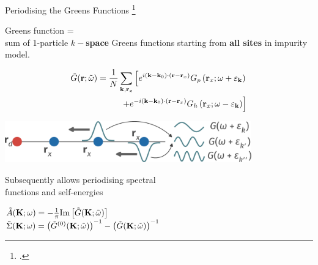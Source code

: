 \documentclass[11pt,aspectratio=169]{beamer}
\newcommand\focus[1]{%
	{\alert{\textbf{#1}}}
}
\begin{document}
\begin{frame}{Periodising the Greens Functions}
	\footcite{kotliar2000,verret2022}
	\begin{minipage}{0.4\textwidth}
	Greens function = \\
	sum of 1-particle \focus{\(k-\)space} Greens functions starting from \focus{all sites} in impurity model.
	\end{minipage}
	\hspace{\fill}
	\begin{minipage}{0.54\textwidth}
	\begin{equation*}\begin{aligned}
		\tilde G({\bf r}; \tilde\omega) = \frac{1}{N}\sum_{{\bf k},{\bf r}_x} \left[e^{i \left({\bf k}- {\bf k}_0\right)\cdot\left({\bf r} - {\bf r}_x\right)}G_p\left({\bf r}_x;\omega + \varepsilon_{\bf k}\right) \right. \\
	\left. + e^{-i \left({\bf k}- {\bf k}_0\right)\cdot\left({\bf r} - {\bf r}_x\right)}G_h\left({\bf r}_x;\omega - \varepsilon_{\bf k}\right)\right]
	\end{aligned}\end{equation*}
	\end{minipage}

	\vspace*{\fill}
	\includegraphics[width=0.8\textwidth]{greensFunc.pdf}

	\vspace*{\fill}
	\begin{minipage}{0.45\textwidth}
	Subsequently allows periodising spectral \\ 
	functions and self-energies
	\end{minipage}
	\hspace{\fill}
	\begin{minipage}{0.5\textwidth}
	\(\tilde A({\bf K}; \omega )= -\frac{1}{\pi}\text{Im}\left[\tilde G({\bf K}; \tilde\omega)\right]\)\\
	\(\tilde \Sigma({\bf K}; \omega) = \left(\tilde G^{(0)}({\bf K}; \tilde\omega)\right)^{-1} - \left(\tilde G({\bf K}; \tilde\omega)\right)^{-1}\)
	\end{minipage}
	
\end{frame}
\end{document}
